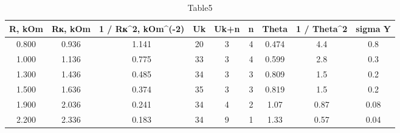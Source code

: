 \begin{table} 
 \caption{Table5}
\begin{tabular}{|*{9}{c|}}
\hline 
R, kOm & Rк, kOm & 1 / Rк^2, kOm^(-2) & Uk & Uk+n & n & Theta & 1 / Theta^2 & sigma Y\\ \hline 
0.800 & 0.936 & 1.141 & 20 & 3 & 4 & 0.474 & 4.4 & 0.8 \\ \hline 
 1.000 & 1.136 & 0.775 & 33 & 3 & 4 & 0.599 & 2.8 & 0.3 \\ \hline 
 1.300 & 1.436 & 0.485 & 34 & 3 & 3 & 0.809 & 1.5 & 0.2 \\ \hline 
 1.500 & 1.636 & 0.374 & 35 & 3 & 3 & 0.819 & 1.5 & 0.2 \\ \hline 
 1.900 & 2.036 & 0.241 & 34 & 4 & 2 & 1.07 & 0.87 & 0.08 \\ \hline 
 2.200 & 2.336 & 0.183 & 34 & 9 & 1 & 1.33 & 0.57 & 0.04 \\ \hline 
 \end{tabular} 
\end{table} 
